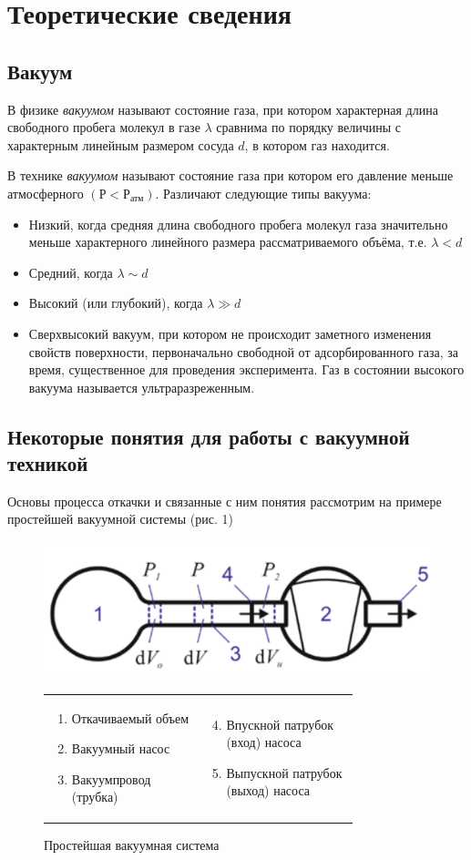 \documentclass[a4paper,12pt]{article}
\theoremstyle{plain} %
\theoremstyle{definition} %
\theoremstyle{remark} %
\begin{document}
	\section {Теоретические сведения}
	\subsection {Вакуум}
	В физике \textit{вакуумом} называют состояние газа, при котором характерная длина свободного пробега молекул в газе $\lambda$ сравнима по порядку величины с характерным линейным размером сосуда $d$, в котором газ находится. 
	
	В технике \textit{вакуумом} называют состояние газа при котором его давление меньше атмосферного $(Р < Р_\text{атм})$. Различают следующие типы вакуума: 
	\begin{itemize}
		\item Низкий, когда средняя длина свободного пробега молекул газа значительно меньше характерного линейного размера рассматриваемого объёма, т.е. \mbox{$\lambda < d$}
		\item Средний, когда $\lambda \sim d$
		\item  Высокий (или глубокий), когда $\lambda \gg d$
		\item Сверхвысокий вакуум, при котором не происходит заметного изменения свойств поверхности, первоначально свободной от адсорбированного газа, за время, существенное для проведения эксперимента. Газ в состоянии высокого вакуума называется ультраразреженным.
	\end{itemize}
\subsection{Некоторые понятия для работы с вакуумной техникой}
Основы процесса откачки и связанные с ним понятия рассмотрим на примере простейшей вакуумной системы (рис. 1)
\begin{figure}[H]
	\begin{center}
	\includegraphics[width=0.6\linewidth]{1}
	\begin{tabular}{p{0.4\linewidth} p{0.4\linewidth}}
		\begin{enumerate}
			\item Откачиваемый объем
			\item Вакуумный насос
			\item Вакуумпровод (трубка)
		\end{enumerate}  &
		\begin{enumerate}
			\setcounter{enumi}{3}
			\item Впускной патрубок (вход) насоса
			\item Выпускной патрубок (выход) насоса
		\end{enumerate} 
	\end{tabular}
	\caption {Простейшая вакуумная система}
	\end{center}
\end{figure}
\end{document}
